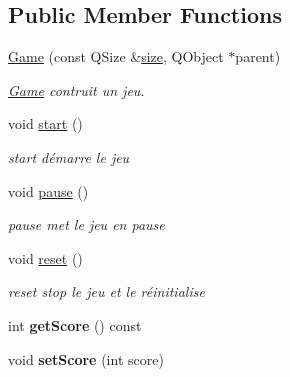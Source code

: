 \subsection*{Public Member Functions}
\begin{DoxyCompactItemize}
\item 
\hyperlink{classGame_a76646df3c285c17da275919046f3724b}{Game} (const Q\-Size \&\hyperlink{classGame_aef028fef77b6498c42f347400b1ebf55}{size}, Q\-Object $\ast$parent)
\begin{DoxyCompactList}\small\item\em \hyperlink{classGame}{Game} contruit un jeu. \end{DoxyCompactList}\item 
\hypertarget{classGame_a3d9b98f7c4a96ecf578f75b96c9f0e90}{void \hyperlink{classGame_a3d9b98f7c4a96ecf578f75b96c9f0e90}{start} ()}\label{classGame_a3d9b98f7c4a96ecf578f75b96c9f0e90}

\begin{DoxyCompactList}\small\item\em start démarre le jeu \end{DoxyCompactList}\item 
\hypertarget{classGame_a4b507ab6c09910b3a621cf1980d65604}{void \hyperlink{classGame_a4b507ab6c09910b3a621cf1980d65604}{pause} ()}\label{classGame_a4b507ab6c09910b3a621cf1980d65604}

\begin{DoxyCompactList}\small\item\em pause met le jeu en pause \end{DoxyCompactList}\item 
\hypertarget{classGame_a39bb2fd26b5ea6b164f28f9f6723582e}{void \hyperlink{classGame_a39bb2fd26b5ea6b164f28f9f6723582e}{reset} ()}\label{classGame_a39bb2fd26b5ea6b164f28f9f6723582e}

\begin{DoxyCompactList}\small\item\em reset stop le jeu et le réinitialise \end{DoxyCompactList}\item 
\hypertarget{classGame_aff506ba208bd7428426e955e79bf3edb}{int {\bfseries get\-Score} () const }\label{classGame_aff506ba208bd7428426e955e79bf3edb}

\item 
\hypertarget{classGame_a9939ead6888ef512af8cace4a211b7b5}{void {\bfseries set\-Score} (int score)}\label{classGame_a9939ead6888ef512af8cace4a211b7b5}


\end{DoxyCompactItemize}
